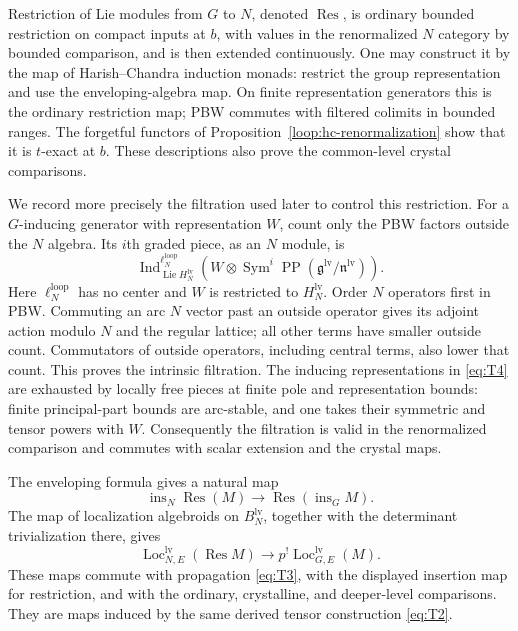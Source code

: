 \documentclass[11pt]{article}
\numberwithin{equation}{section}
\theoremstyle{definition}
\theoremstyle{remark}
\begin{document}
Restriction of Lie modules from $G$ to $N$, denoted
$\operatorname{Res}$, is ordinary bounded restriction on compact
inputs at $b$, with values in the renormalized $N$ category by bounded
comparison, and is then extended continuously.  One may construct it
by the map of Harish--Chandra induction monads: restrict the group
representation and use the enveloping-algebra map.  On finite
representation generators this is the ordinary restriction map;
PBW commutes with filtered colimits in bounded ranges.  The
forgetful functors of Proposition~\ref{loop:hc-renormalization}
show that it is $t$-exact at $b$.
These descriptions also prove the common-level crystal comparisons.

We record more precisely the filtration used later to control this
restriction.  For a $G$-inducing generator with representation $W$,
count only the PBW factors outside the $N$ algebra.  Its $i$th graded
piece, as an $N$ module, is
\begin{equation}\label{eq:T4}
 \operatorname{Ind}_{\operatorname{Lie}H_N^{\mathrm{lv}}}
                   ^{\ell_N^{\mathrm{loop}}}
 \left(W\otimes
  \operatorname{Sym}^i\operatorname{PP}(
                     \mathfrak g^{\mathrm{lv}}/
                     \mathfrak n^{\mathrm{lv}})\right).
\end{equation}
Here $\ell_N^{\mathrm{loop}}$ has no center and $W$ is restricted to
$H_N^{\mathrm{lv}}$.  Order $N$ operators first in PBW.  Commuting an
arc $N$ vector past an outside operator gives its adjoint action
modulo $N$ and the regular lattice; all other terms have smaller
outside count.  Commutators of outside operators, including central
terms, also lower that count.  This proves the intrinsic filtration.
The inducing representations in \eqref{eq:T4} are exhausted by
locally free pieces at finite pole and representation bounds:
finite principal-part bounds are arc-stable, and one takes their
symmetric and tensor powers with $W$.  Consequently the filtration
is valid in the renormalized comparison and commutes with scalar
extension and the crystal maps.

The enveloping formula gives a natural map
\[
 \operatorname{ins}_N\operatorname{Res}(M)
       \longrightarrow
       \operatorname{Res}(\operatorname{ins}_G M).
\]
The map of localization algebroids on $B_N^{\mathrm{lv}}$, together
with the determinant trivialization there, gives
\begin{equation}\label{eq:T5}
 \operatorname{Loc}_{N,E}^{\mathrm{lv}}(
                              \operatorname{Res}M)
       \longrightarrow
 p^!\operatorname{Loc}_{G,E}^{\mathrm{lv}}(M).
\end{equation}
These maps commute with propagation \eqref{eq:T3}, with the displayed
insertion map for restriction, and with the ordinary, crystalline,
and deeper-level comparisons.  They are maps induced by the same
derived tensor construction \eqref{eq:T2}.
\end{document}
